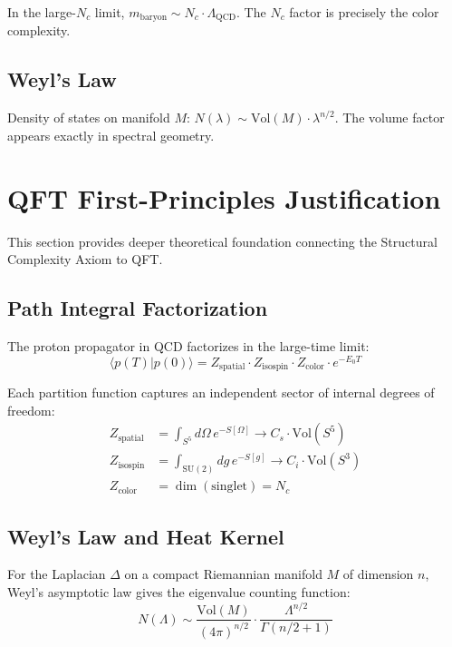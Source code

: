 In the large-$N_c$ limit, $m_{\text{baryon}} \sim N_c \cdot \Lambda_{\text{QCD}}$. The $N_c$ factor is precisely the color complexity.

\subsection{Weyl's Law}

Density of states on manifold $M$: $N(\lambda) \sim \text{Vol}(M) \cdot \lambda^{n/2}$. The volume factor appears exactly in spectral geometry.

\section{QFT First-Principles Justification}

This section provides deeper theoretical foundation connecting the Structural Complexity Axiom to QFT.

\subsection{Path Integral Factorization}

The proton propagator in QCD factorizes in the large-time limit:
\begin{equation}
\langle p(T)|p(0)\rangle = Z_{\text{spatial}} \cdot Z_{\text{isospin}} \cdot Z_{\text{color}} \cdot e^{-E_0 T}
\end{equation}

Each partition function captures an independent sector of internal degrees of freedom:
\begin{align}
Z_{\text{spatial}} &= \int_{S^5} d\Omega \, e^{-S[\Omega]} \to C_s \cdot \text{Vol}(S^5) \\
Z_{\text{isospin}} &= \int_{\text{SU}(2)} dg \, e^{-S[g]} \to C_i \cdot \text{Vol}(S^3) \\
Z_{\text{color}} &= \dim(\text{singlet}) = N_c
\end{align}

\subsection{Weyl's Law and Heat Kernel}

For the Laplacian $\Delta$ on a compact Riemannian manifold $M$ of dimension $n$, Weyl's asymptotic law gives the eigenvalue counting function:
\begin{equation}
N(\Lambda) \sim \frac{\text{Vol}(M)}{(4\pi)^{n/2}} \cdot \frac{\Lambda^{n/2}}{\Gamma(n/2 + 1)}
\end{equation}


